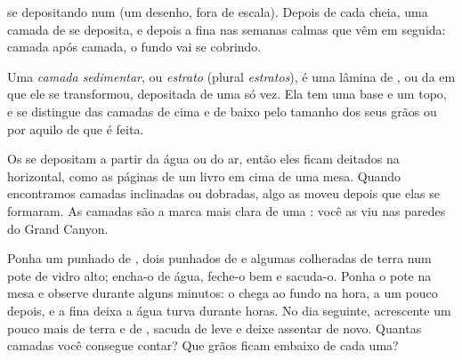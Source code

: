 \begin{omfigure}
{\small {} se depositando num  (um desenho, fora de escala).
Depois de cada cheia, uma camada de  se deposita, e depois a 
fina nas semanas calmas que vêm em seguida: camada após camada, o fundo
vai se cobrindo.}
\label{fig:g7:sediments-and-fossils:lake}
\end{omfigure}

\begin{definition}\label{def:g7:sediments-and-fossils:layer}
Uma \emph{camada sedimentar}, ou
\emph{estrato} (plural \emph{estratos}), é uma lâmina de
, ou da  em que ele se transformou, depositada de uma só
vez. Ela tem uma base e um topo, e se distingue das camadas de cima e de
baixo pelo tamanho dos seus grãos ou por aquilo de que é feita.
\end{definition}

Os  se depositam a partir da água ou do ar, então eles ficam
deitados na horizontal, como as páginas de um livro em cima de uma mesa.
Quando encontramos camadas inclinadas ou dobradas, algo as moveu depois
que elas se formaram. As camadas são a marca mais clara de uma : você as viu nas paredes do Grand Canyon.

\begin{inthelab}
Ponha um punhado de , dois punhados de  e algumas colheradas
de terra num pote de vidro alto; encha-o de água, feche-o bem e sacuda-o.
Ponha o pote na mesa e observe durante alguns minutos: o  chega
ao fundo na hora, a  um pouco depois, e a  fina deixa a água
turva durante horas. No dia seguinte, acrescente um pouco mais de terra e
de , sacuda de leve e deixe assentar de novo. Quantas camadas você
consegue contar? Que grãos ficam embaixo de cada uma?
\end{inthelab}

